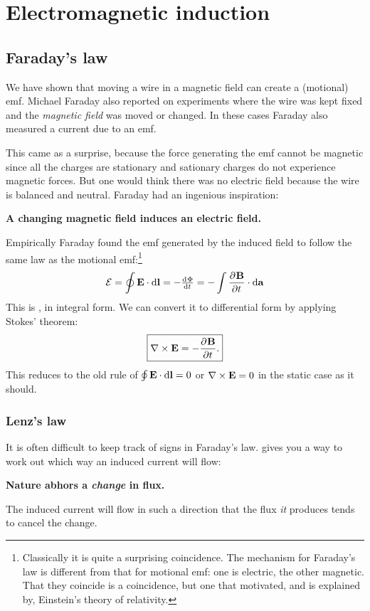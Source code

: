 \section{Electromagnetic induction}
\subsection{Faraday's law}
We have shown that moving a wire in a magnetic field can create a (motional) emf. Michael Faraday also reported on experiments where the wire was kept fixed and the \textit{magnetic field} was moved or changed. In these cases Faraday also measured a current due to an emf.

This came as a surprise, because the force generating the emf cannot be magnetic since all the charges are stationary and sationary charges do not experience magnetic forces. But one would think there was no electric field because the wire is balanced and neutral. Faraday had an ingenious inspiration:
\begin{center}
\textbf{A changing magnetic field induces an electric field.}
\end{center}
Empirically Faraday found the emf generated by the induced field to follow the same law as the motional emf:\footnote{Classically it is quite a surprising coincidence. The mechanism for Faraday's law is different from that for motional emf: one is electric, the other magnetic. That they coincide is a coincidence, but one that motivated, and is explained by, Einstein's theory of relativity.}
\[ \mathcal{E} = \oint \vec{E}\cdot \diff{\vec{l}} = - \od{\Phi}{t} = -\int \pd{\vec{B}}{t}\cdot \diff{\vec{a}} \]
This is , in integral form. We can convert it to differential form by applying Stokes' theorem:
\[ \boxed{\mathop{}\! \nabla\times \bm{\mathrm{E}} = -  \frac{\partial{^{}}\bm{\mathrm{B}}}{\partial{{t}^{}}} .} \]
This reduces to the old rule of $\oint \bm{\mathrm{E}}\cdot \operatorname{d \!}{\bm{\mathrm{l}}} = 0$ or $\mathop{}\! \nabla\times \bm{\mathrm{E}} = 0$ in the static case as it should.

\subsubsection{Lenz's law}
It is often difficult to keep track of signs in Faraday's law.  gives you a way to work out which way an induced current will flow:
\begin{center}
\textbf{Nature abhors a \textit{change} in flux.}
\end{center}
The induced current will flow in such a direction that the flux \textit{it} produces tends to cancel the change.
